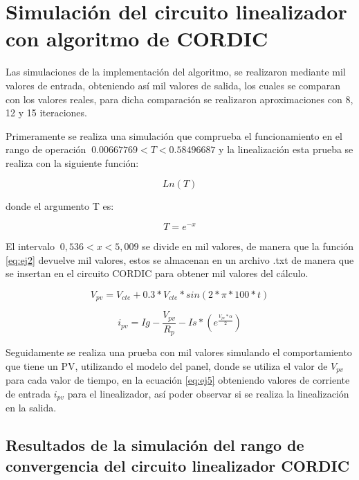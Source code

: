 \section{Simulación del circuito linealizador con algoritmo de CORDIC}

Las simulaciones de la implementación del algoritmo, se realizaron mediante mil valores de entrada, obteniendo así mil valores de salida, los cuales se comparan con los valores reales, para dicha comparación se realizaron aproximaciones con 8, 12 y 15 iteraciones. 

Primeramente se realiza una simulación que comprueba el funcionamiento en el rango de operación $\ 0.00667769 < T < 0.58496687 $ y la linealización esta prueba se realiza con la siguiente función: 

\begin{equation} \label{eq:ej2}
  Ln \left(T \right) 
\end{equation} 

donde el argumento T es:

\begin{equation} \label{eq:ej3}
   T = e^{-x}         
\end{equation} 
  
El intervalo $\ 0,536 < x < 5,009$ se divide en mil valores, de manera que la función \ref{eq:ej2} devuelve mil valores, estos se almacenan en un archivo .txt de manera que se insertan en el circuito CORDIC para obtener mil valores del cálculo. 


\begin{equation} \label{eq:ej4}
   V_{pv} = V_{cte} + 0.3*V_{cte}*sin(2* \pi *100*t)     
\end{equation}


    
\begin{equation} \label{eq:ej5}
   i_{pv} = Ig - \frac{V_{pv}}{R_p} - Is*\left(e^\frac{V_{pv}* \alpha}{2}\right)         
\end{equation} 


Seguidamente se realiza una prueba con mil valores simulando el comportamiento que tiene un PV, utilizando el modelo del panel, donde se utiliza el valor de $ V_{pv} $ para cada valor de tiempo, en la ecuación \ref{eq:ej5} obteniendo valores de corriente de entrada $ i_{pv} $ para el linealizador, así poder observar si se realiza la linealización en la salida. 



\subsection{Resultados de la simulación del rango de convergencia del circuito linealizador CORDIC}

